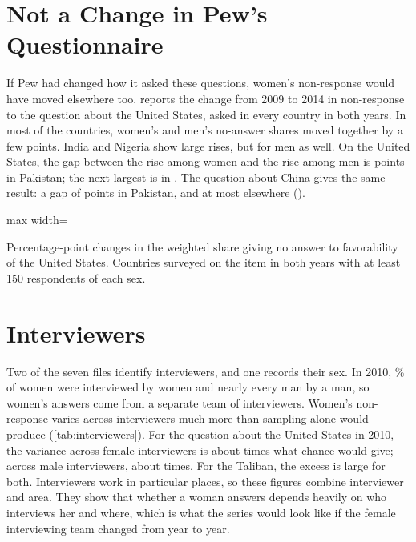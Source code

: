 \documentclass[11pt,letterpaper]{article}
\newcommand{\TableStyle}{\normalsize\setlength{\tabcolsep}{6pt}\renewcommand{\arraystretch}{1}}
\newcommand{\tablenote}[1]{\par\smallskip\begin{minipage}{\linewidth}\footnotesize #1\end{minipage}}
\begin{document}
\section{Not a Change in Pew's Questionnaire}

If Pew had changed how it asked these questions, women's non-response would have moved elsewhere too.  reports the change from 2009 to 2014 in non-response to the question about the United States, asked in every country in both years. In most of the \PlaceboCountries{} countries, women's and men's no-answer shares moved together by a few points. India and Nigeria show large rises, but for men as well. On the United States, the gap between the rise among women and the rise among men is \PakistanUSGap{} points in Pakistan; the next largest is \NextUSGap{} in \NextUSGapCountry{}. The question about China gives the same result: a gap of \PakistanChinaGap{} points in Pakistan, and at most \NextChinaGap{} elsewhere (\NextChinaGapCountry{}).

\begin{table}[htbp]
\centering\TableStyle
\caption{Change in no answer, 2009 to 2014, by country and sex}
\label{tab:other}
\begin{adjustbox}{max width=\linewidth}

\end{adjustbox}
\tablenote{Percentage-point changes in the weighted share giving no answer to favorability of the United States. Countries surveyed on the item in both years with at least 150 respondents of each sex.}
\end{table}

\section{Interviewers}

Two of the seven files identify interviewers, and one records their sex. In 2010, \SameSexInterviewer{}\% of women were interviewed by women and nearly every man by a man, so women's answers come from a separate team of interviewers. Women's non-response varies across interviewers much more than sampling alone would produce (\cref{tab:interviewers}). For the question about the United States in 2010, the variance across female interviewers is about \WomenUSInterviewerRatio{} times what chance would give; across male interviewers, about \MenUSInterviewerRatio{} times. For the Taliban, the excess is large for both. Interviewers work in particular places, so these figures combine interviewer and area. They show that whether a woman answers depends heavily on who interviews her and where, which is what the series would look like if the female interviewing team changed from year to year.
\end{document}
